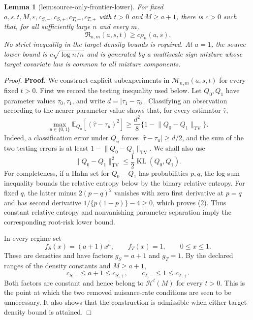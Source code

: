 \documentclass{article}
\newtheorem{lemma}{Lemma}
\begin{document}
\begin{lemma}[lem:source-only-frontier-lower]\label{lem:source-only-frontier-lower}
For fixed \(a,s,t,M,\varepsilon,c_{S,-},c_{S,+},c_{T,-},c_{T,+}\) with \(t>0\) and \(M\ge a+1\), there is \(c>0\) such that, for all sufficiently large \(n\) and every \(m\),
\[
\mathfrak R_{n,m}(a,s,t)\ge c\rho_n(a,s).
\]
No strict inequality in the target-density bounds is required. At \(a=1\), the source lower bound is \(c\sqrt{\log n/n}\) and is generated by a multiscale sign mixture whose target covariate law is common to all mixture components.
\end{lemma}
\begin{proof}
\textbf{Proof.}
We construct explicit subexperiments in \(\mathcal M_{n,m}(a,s,t)\) for every fixed \(t>0\). First we record the testing inequality used below. Let \(Q_0,Q_1\) have parameter values \(\tau_0,\tau_1\), and write \(d=|\tau_1-\tau_0|\). Classifying an observation according to the nearer parameter value shows that, for every estimator \(\widehat\tau\),
\[
 \max_{u\in\{0,1\}}\mathbb E_{Q_u}
       [ (\widehat\tau-\tau_u)^2 ]
 \ge \frac{d^2}{8}
       \{1-\lVert Q_0-Q_1\rVert_{\mathrm{TV}}\}.
\tag{1}
\]
Indeed, a classification error under \(Q_u\) forces \(|\widehat\tau-\tau_u|\ge d/2\), and the sum of the two testing errors is at least \(1-\lVert Q_0-Q_1\rVert_{\mathrm{TV}}\). We shall also use
\[
 \lVert Q_0-Q_1\rVert_{\mathrm{TV}}^2
 \le \frac12\operatorname{KL}(Q_0,Q_1).
\tag{2}
\]
For completeness, if a Hahn set for \(Q_0-Q_1\) has probabilities \(p,q\), the log-sum inequality bounds the relative entropy below by the binary relative entropy. For fixed \(q\), the latter minus \(2(p-q)^2\) vanishes with zero first derivative at \(p=q\) and has second derivative \(1/\{p(1-p)\}-4\ge0\), which proves (2). Thus constant relative entropy and nonvanishing parameter separation imply the corresponding root-risk lower bound.

In every regime set
\[
 f_S(x)=(a+1)x^a,
 \qquad f_T(x)=1,
 \qquad 0\le x\le1.
\tag{3}
\]
These are densities and have factors \(g_S=a+1\) and \(g_T=1\). By the declared ranges of the density constants and \(M\ge a+1\),
\[
 c_{S,-}\le a+1\le c_{S,+},
 \qquad c_{T,-}\le1\le c_{T,+}.
\tag{4}
\]
Both factors are constant and hence belong to \(\mathcal H^t(M)\) for every \(t>0\). This is the point at which the two removed nuisance-rate conditions are seen to be unnecessary. It also shows that the construction is admissible when either target-density bound is attained.


\end{proof}
\end{document}
